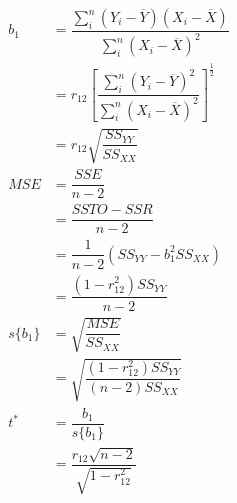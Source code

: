 \documentclass[]{article}
\begin{document}
\begin{align*}
b_1&=\dfrac{\sum\limits_{i}^n(Y_{i}-\overline{Y})(X_{i}-\overline{X})}{\sum\limits_{i}^n(X_{i}-\overline{X})^2}\\
&=r_{12}\left[\dfrac{\sum\limits_{i}^n(Y_{i}-\overline{Y})^2}{\sum\limits_{i}^n(X_{i}-\overline{X})^2}\right]^{\frac{1}{2}}\\
&=r_{12}\sqrt{\dfrac{SS_{YY}}{SS_{XX}}}\\
MSE&=\dfrac{SSE}{n-2}\\
&=\dfrac{SSTO-SSR}{n-2}\\
&=\dfrac{1}{n-2}(SS_{YY}-b_1^2SS_{XX})\\
&=\dfrac{(1-r_{12}^2)SS_{YY}}{n-2}\\
s\{b_1\}&=\sqrt{\dfrac{MSE}{SS_{XX}}}\\
&=\sqrt{\dfrac{(1-r_{12}^2)SS_{YY}}{(n-2)SS_{XX}}}\\
t^*&=\dfrac{b_1}{s\{b_1\}}\\
&=\dfrac{r_{12}\sqrt{n-2}}{\sqrt{1-r_{12}^2}}
\end{align*}
\end{document}
